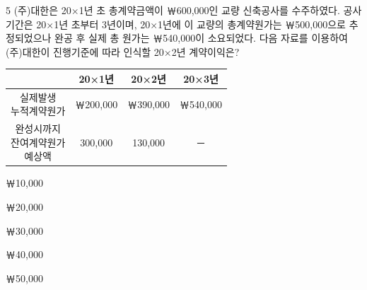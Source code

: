 \begin{question}{5}
(주)대한은 20×1년 초 총계약금액이 ￦600,000인 교량 신축공사를 수주하였다. 공사기간은 20×1년 초부터 3년이며, 20×1년에 이 교량의 총계약원가는 ￦500,000으로 추정되었으나 완공 후 실제 총 원가는 ￦540,000이 소요되었다. 다음 자료를 이용하여 (주)대한이 진행기준에 따라 인식할 20×2년 계약이익은?
\begin{center}
\small
\begin{tabular}{|c|c|c|c|}
\hline
 & 20×1년 & 20×2년 & 20×3년 \\
\hline
\makecell{실제발생\\누적계약원가} & ￦200,000 & ￦390,000 & ￦540,000 \\
\hline
\makecell{완성시까지\\잔여계약원가\\예상액} & 300,000 & 130,000 & － \\
\hline
\end{tabular}
\end{center}
\begin{choices}
  \item ￦10,000
  \item ￦20,000
  \item ￦30,000
  \item ￦40,000
  \item ￦50,000
\end{choices}
\end{question}
